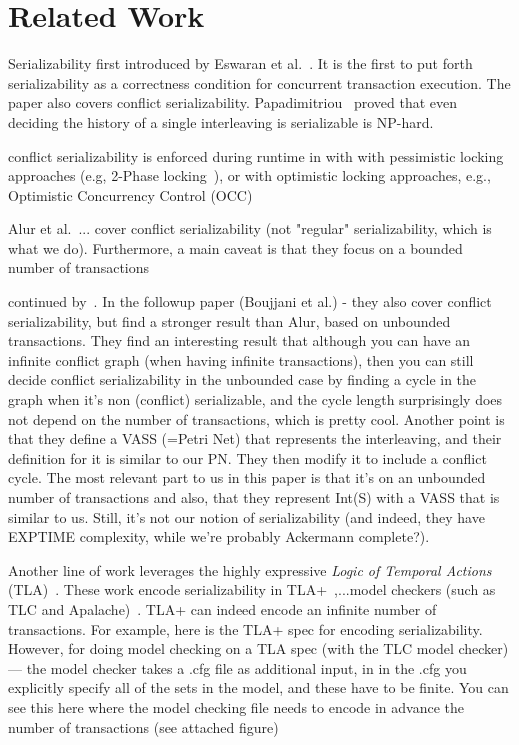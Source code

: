 \section{Related Work}
\label{sec:relatedWork}



Serializability first introduced by Eswaran et al.~\cite{EsGrKoTr76}.  It is the first to put forth serializability as a correctness condition for concurrent transaction execution.
The paper also covers conflict serializability. 
%
Papadimitriou~\cite{Pa79} proved that even deciding the history of a single interleaving is serializable is NP-hard.

conflict serializability is enforced during runtime in 
with with pessimistic locking approaches (e.g, 2-Phase locking~\cite{BeHaGo87}), or with optimistic locking approaches, e.g., Optimistic Concurrency Control (OCC)~\cite{KuRo81, BuMo06}


Alur et al.~\cite{AlMcPe96}... 
cover conflict serializability (not "regular" serializability, which is what we do). Furthermore, a main caveat is that they focus on a bounded number of transactions



continued by~\cite{BoEmEnHa13}.
In the followup paper (Boujjani et al.) - they also cover conflict serializability, but find a stronger result than Alur, based on unbounded transactions. They find an interesting result that although you can have an infinite conflict graph (when having infinite transactions), then you can still decide conflict serializability in the unbounded case by finding a cycle in the graph when it's non (conflict) serializable, and the cycle length surprisingly does not depend on the number of transactions, which is pretty cool. Another point is that they define a VASS (=Petri Net) that represents the interleaving, and their definition for it is similar to our PN. They then modify it to include a conflict cycle. The most relevant part to us in this paper is that it's on an unbounded number of transactions and also, that they represent Int(S) with a VASS that is similar to us. Still, it's not our notion of serializability (and indeed, they have EXPTIME complexity, while we're probably Ackermann complete?).



Another line of work leverages the highly expressive \textit{Logic of Temporal Actions} (TLA)~\cite{La94}. 
%
These work encode
serializability in TLA+~\cite{SoVaVi20, Ho24},...model checkers (such as TLC and Apalache)~\cite{YuMaLa99, KoKuTr19}.
%
TLA+ can indeed encode an infinite number of transactions. For example, here is the TLA+ spec for encoding serializability.
However, for doing model checking on a TLA spec (with the TLC model checker) --- the model checker takes a .cfg file as additional input, in in the .cfg you explicitly specify all of the sets in the model, and these have to be finite. You can see this here where the model checking file needs to encode in advance the number of transactions (see attached figure)

